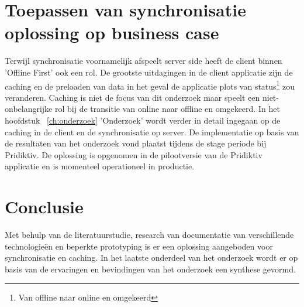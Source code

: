\section{Toepassen van synchronisatie oplossing op business case}
Terwijl synchronisatie voornamelijk afspeelt server side heeft de client binnen 'Offline First' ook een rol. De grootste uitdagingen in de client applicatie zijn de caching en de preloaden van data in het geval de applicatie plots van status\footnote{Van offline naar online en omgekeerd} zou veranderen. Caching is niet de focus van dit onderzoek maar speelt een niet-onbelangrijke rol bij de transitie van online naar offline en omgekeerd. In het hoofdstuk ~\ref{ch:onderzoek} 'Onderzoek' wordt verder in detail ingegaan op de caching in de client en de synchronisatie op server. De implementatie op basis van de resultaten van het onderzoek vond plaatst tijdens de stage periode bij Pridiktiv. De oplossing is opgenomen in de pilootversie van de Pridiktiv applicatie en is momenteel operationeel in productie.
\section{Conclusie}
Met behulp van de literatuurstudie, research van documentatie van verschillende technologie\"en en beperkte prototyping is er een oplossing aangeboden voor synchronisatie en caching. In het laatste onderdeel van het onderzoek wordt er op basis van de ervaringen en bevindingen van het onderzoek een synthese gevormd.